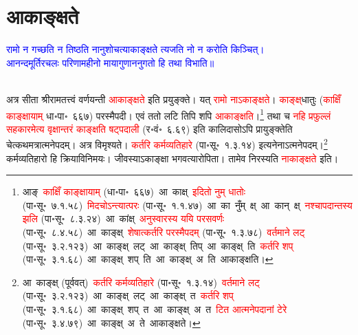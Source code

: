 \section[आकाङ्क्षते]{आकाङ्क्षते}
\centering\textcolor{blue}{रामो न गच्छति न तिष्ठति नानुशोचत्याकाङ्क्षते त्यजति नो न करोति किञ्चित्।\nopagebreak\\
आनन्दमूर्तिरचलः परिणामहीनो मायागुणाननुगतो हि तथा विभाति॥}\nopagebreak\\
\\
\fontsize{14}{21}\selectfont\begin{sloppypar}\justifying\noindent\hspace{10mm} अत्र सीता श्रीराम\-तत्त्वं वर्णयन्ती \textcolor{red}{आकाङ्क्षते} इति प्रयुङ्क्ते। यत् \textcolor{red}{रामो नाऽकाङ्क्षते}। \textcolor{red}{काङ्क्ष्‌}\-धातुः (\textcolor{red}{काक्षिँ काङ्क्षायाम्} धा॰पा॰~६६७) परस्मैपदी। एवं ततो लटि तिपि शपि \textcolor{red}{आकाङ्क्षति}।\footnote{आङ्~\textcolor{red}{काक्षिँ काङ्क्षायाम्} (धा॰पा॰~६६७)~\arrow आ~काक्ष्~\arrow \textcolor{red}{इदितो नुम् धातोः} (पा॰सू॰~७.१.५८)~\arrow \textcolor{red}{मिदचोऽन्त्यात्परः} (पा॰सू॰~१.१.४७)~\arrow आ~का~नुँम्~क्ष्~\arrow आ~कान्~क्ष्~\arrow \textcolor{red}{नश्चापदान्तस्य झलि} (पा॰सू॰~८.३.२४)~\arrow आ~कांक्ष्~\arrow \textcolor{red}{अनुस्वारस्य ययि परसवर्णः} (पा॰सू॰~८.४.५८)~\arrow आ~काङ्क्ष्~\arrow \textcolor{red}{शेषात्कर्तरि परस्मैपदम्} (पा॰सू॰~१.३.७८)~\arrow \textcolor{red}{वर्तमाने लट्} (पा॰सू॰~३.२.१२३)~\arrow आ~काङ्क्ष्~लट्~\arrow आ~काङ्क्ष्~तिप्~\arrow आ~काङ्क्ष्~ति~\arrow \textcolor{red}{कर्तरि शप्‌} (पा॰सू॰~३.१.६८)~\arrow आ~काङ्क्ष्~शप्~ति~\arrow आ~काङ्क्ष्~अ~ति~\arrow आकाङ्क्षति।} तथा च \textcolor{red}{नहि प्रफुल्लं सहकारमेत्य वृक्षान्तरं काङ्क्षति षट्पदाली} (र॰वं॰~६.६९) इति कालिदासोऽपि प्रायुङ्क्तेति चेत्कथमत्रात्मनेपदम्। अत्र विमृश्यते। \textcolor{red}{कर्तरि कर्म\-व्यतिहारे} (पा॰सू॰~१.३.१४) इत्यनेनाऽत्मनेपदम्।\footnote{आ~काङ्क्ष् (पूर्ववत्)~\arrow \textcolor{red}{कर्तरि कर्म\-व्यतिहारे} (पा॰सू॰~१.३.१४)~\arrow \textcolor{red}{वर्तमाने लट्} (पा॰सू॰~३.२.१२३)~\arrow आ~काङ्क्ष्~लट्~\arrow आ~काङ्क्ष्~त~\arrow \textcolor{red}{कर्तरि शप्‌} (पा॰सू॰~३.१.६८)~\arrow आ~काङ्क्ष्~शप्~त~\arrow आ~काङ्क्ष्~अ~त~\arrow \textcolor{red}{टित आत्मनेपदानां टेरे} (पा॰सू॰~३.४.७९)~\arrow आ~काङ्क्ष्~अ~ते~\arrow आकाङ्क्षते।} कर्म\-व्यतिहारो हि क्रिया\-विनिमयः। जीवस्याऽकाङ्क्षा भगवत्यारोपिता। तामेव निरस्यति \textcolor{red}{नाकाङ्क्षते} इति।\end{sloppypar}
